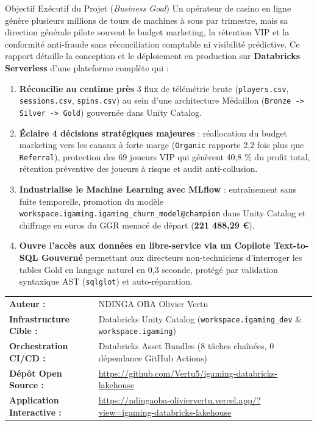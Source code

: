 \documentclass[11pt,a4paper]{article}
\begin{document}
\begin{titlepage}
    \vspace{0.5cm}
    \begin{execbox}{Objectif Exécutif du Projet (\textit{Business Goal})}
        Un opérateur de casino en ligne génère plusieurs millions de tours de machines à sous par trimestre, mais sa direction générale pilote souvent le budget marketing, la rétention VIP et la conformité anti-fraude sans réconciliation comptable ni visibilité prédictive. Ce rapport détaille la conception et le déploiement en production sur \textbf{Databricks Serverless} d'une plateforme complète qui :
        \begin{enumerate}
            \item \textbf{Réconcilie au centime près} 3 flux de télémétrie brute (\texttt{players.csv}, \texttt{sessions.csv}, \texttt{spins.csv}) au sein d'une architecture Médaillon (\texttt{Bronze -> Silver -> Gold}) gouvernée dans Unity Catalog.
            \item \textbf{Éclaire 4 décisions stratégiques majeures} : réallocation du budget marketing vers les canaux à forte marge (\texttt{Organic} rapporte 2,2 fois plus que \texttt{Referral}), protection des 69 joueurs VIP qui génèrent 40,8 \% du profit total, rétention préventive des joueurs à risque et audit anti-collusion.
            \item \textbf{Industrialise le Machine Learning avec MLflow} : entraînement sans fuite temporelle, promotion du modèle \texttt{workspace.igaming.igaming\_churn\_model@champion} dans Unity Catalog et chiffrage en euros du GGR menacé de départ (\textbf{221 488,29 \euro}).
            \item \textbf{Ouvre l'accès aux données en libre-service via un Copilote Text-to-SQL Gouverné} permettant aux directeurs non-techniciens d'interroger les tables Gold en langage naturel en 0,3 seconde, protégé par validation syntaxique AST (\texttt{sqlglot}) et auto-réparation.
        \end{enumerate}
    \end{execbox}

    \vfill
    \small
    \begin{tabular}{ll}
        \textbf{Auteur :} & NDINGA OBA Olivier Vertu \\
        \textbf{Infrastructure Cible :} & Databricks Unity Catalog (\texttt{workspace.igaming\_dev} \& \texttt{workspace.igaming}) \\
        \textbf{Orchestration CI/CD :} & Databricks Asset Bundles (8 tâches chaînées, 0 dépendance GitHub Actions) \\
        \textbf{Dépôt Open Source :} & \url{https://github.com/Vertu5/igaming-databricks-lakehouse} \\
        \textbf{Application Interactive :} & \url{https://ndingaoba-oliviervertu.vercel.app/?view=igaming-databricks-lakehouse}
    \end{tabular}
\end{titlepage}
\end{document}
